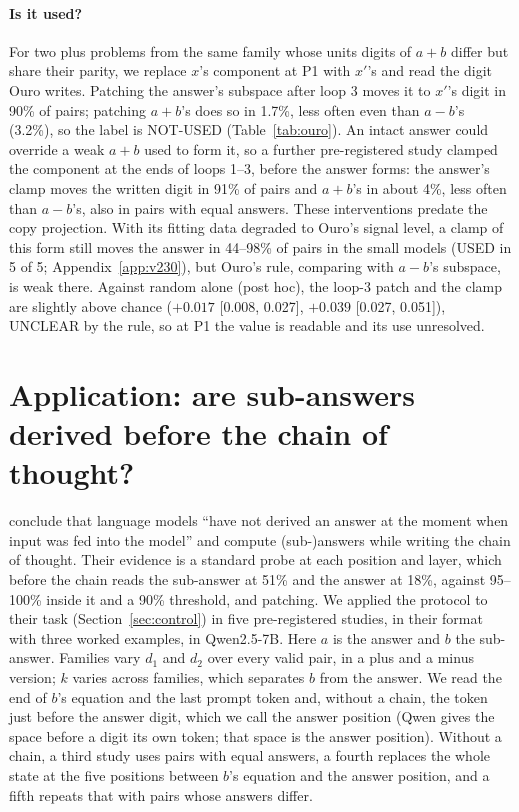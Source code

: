 \documentclass{article}
\begin{document}
\paragraph{Is it used?} For two plus problems from the same family whose units digits of $a+b$ differ but share their parity, we replace $x$'s component at P1 with $x'$'s and read the digit Ouro writes. Patching the answer's subspace after loop 3 moves it to $x'$'s digit in 90\% of pairs; patching $a+b$'s does so in 1.7\%, less often even than $a-b$'s (3.2\%), so the label is NOT-USED (Table~\ref{tab:ouro}). An intact answer could override a weak $a+b$ used to form it, so a further pre-registered study clamped the component at the ends of loops 1--3, before the answer forms: the answer's clamp moves the written digit in 91\% of pairs and $a+b$'s in about 4\%, less often than $a-b$'s, also in pairs with equal answers. These interventions predate the copy projection. With its fitting data degraded to Ouro's signal level, a clamp of this form still moves the answer in 44--98\% of pairs in the small models (USED in 5 of 5; Appendix~\ref{app:v230}), but Ouro's rule, comparing with $a-b$'s subspace, is weak there. Against random alone (post hoc), the loop-3 patch and the clamp are slightly above chance ($+0.017$ [0.008, 0.027], $+0.039$ [0.027, 0.051]), UNCLEAR by the rule, so at P1 the value is readable and its use unresolved.

\section{Application: are sub-answers derived before the chain of thought?}\label{sec:kudo}

\citet{kudo2026} conclude that language models ``have not derived an answer at the moment when input was fed into the model'' and compute (sub-)answers while writing the chain of thought. Their evidence is a standard probe at each position and layer, which before the chain reads the sub-answer at 51\% and the answer at 18\%, against 95--100\% inside it and a 90\% threshold, and patching. We applied the protocol to their task (Section~\ref{sec:control}) in five pre-registered studies, in their format with three worked examples, in Qwen2.5-7B. Here $a$ is the answer and $b$ the sub-answer. Families vary $d_1$ and $d_2$ over every valid pair, in a plus and a minus version; $k$ varies across families, which separates $b$ from the answer. We read the end of $b$'s equation and the last prompt token and, without a chain, the token just before the answer digit, which we call the answer position (Qwen gives the space before a digit its own token; that space is the answer position). Without a chain, a third study uses pairs with equal answers, a fourth replaces the whole state at the five positions between $b$'s equation and the answer position, and a fifth repeats that with pairs whose answers differ.
\end{document}
